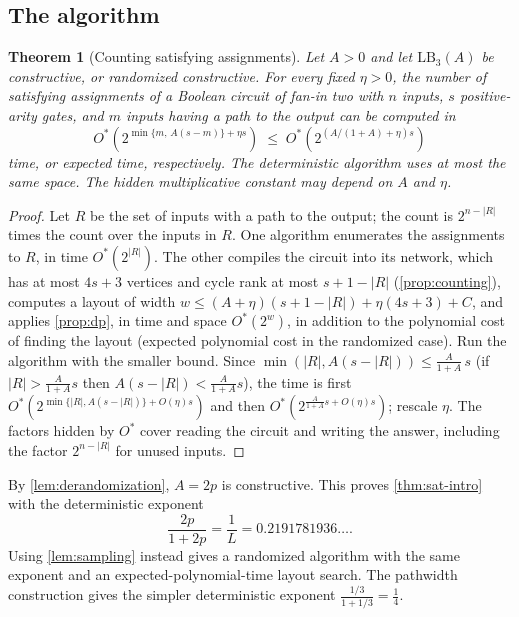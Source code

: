 \documentclass[11pt]{article}
\theoremstyle{plain}
\newtheorem{theorem}{Theorem}[section]
\theoremstyle{definition}
\theoremstyle{remark}
\newcommand{\LB}{\mathrm{LB}}
\newcommand{\card}[1]{\lvert #1\rvert}
\begin{document}
\subsection{The algorithm}

\begin{theorem}[Counting satisfying assignments]
\label{thm:sat}
Let $A>0$ and let $\LB_3(A)$ be constructive, or randomized constructive. For every fixed
$\eta>0$, the number of satisfying assignments of a Boolean circuit of fan-in two with $n$
inputs, $s$ positive-arity gates, and $m$ inputs having a path to the output can be computed in
\[
  O^*\!\left(2^{\min\{m,\,A(s-m)\}+\eta s}\right)
  \;\le\; O^*\!\left(2^{(A/(1+A)+\eta)s}\right)
\]
time, or expected time, respectively. The deterministic algorithm uses at most the same
space. The hidden multiplicative constant may depend on $A$ and $\eta$.
\end{theorem}

\begin{proof}
Let $R$ be the set of inputs with a path to the output; the count is $2^{n - \card R}$ times the
count over the inputs in $R$. One algorithm enumerates the assignments to $R$, in time
$O^*(2^{\card R})$. The other compiles the circuit into its network, which has at most
$4s + 3$ vertices and cycle rank at most $s + 1 - \card R$ (\cref{prop:counting}), computes a
layout of width $w \le (A + \eta)(s + 1 - \card R) + \eta(4s + 3) + C$, and applies
\cref{prop:dp}, in time and space $O^*(2^w)$, in addition to the polynomial cost of finding
the layout (expected polynomial cost in the randomized case). Run the algorithm with the
smaller bound. Since
$\min(\card R, A(s - \card R)) \le \frac{A}{1+A}\,s$ (if $\card R > \frac{A}{1+A}s$ then
$A(s - \card R) < \frac{A}{1+A}s$), the time is first
$O^*(2^{\min\{\card R,A(s-\card R)\}+O(\eta)s})$ and then
$O^*(2^{\frac{A}{1+A}s+O(\eta)s})$; rescale $\eta$. The factors hidden by $O^*$ cover reading
the circuit and writing the answer, including the factor $2^{n-\card R}$ for unused inputs.
\end{proof}

By \cref{lem:derandomization}, $A=2p$ is constructive. This proves \cref{thm:sat-intro} with
the deterministic exponent
\[
  \frac{2p}{1+2p}=\frac{1}{L}=0.2191781936\ldots .
\]
Using \cref{lem:sampling} instead gives a randomized algorithm with the same exponent and an
expected-polynomial-time layout search. The pathwidth construction gives the simpler
deterministic exponent $\frac{1/3}{1+1/3}=\frac14$.
\end{document}
